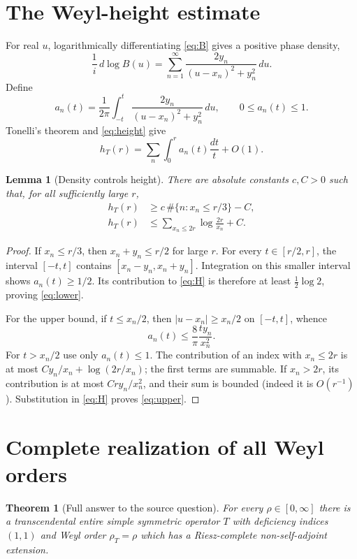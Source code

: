 \documentclass[11pt]{article}
\newtheorem{theorem}{Theorem}
\newtheorem{lemma}{Lemma}
\begin{document}
\section{The Weyl-height estimate}

For real $u$, logarithmically differentiating \eqref{eq:B} gives a positive
phase density,
\[
 \frac1i\,d\log B(u)
 =\sum_{n=1}^{\infty}\frac{2y_n}{(u-x_n)^2+y_n^2}\,du.
\]
Define
\[
 a_n(t)=\frac1{2\pi}\int_{-t}^{t}
          \frac{2y_n}{(u-x_n)^2+y_n^2}\,du,
 \qquad 0\le a_n(t)\le1.
\]
Tonelli's theorem and \eqref{eq:height} give
\begin{equation}\label{eq:H}
 h_T(r)=\sum_n\int_0^r a_n(t)\frac{dt}{t}+O(1).
\end{equation}

\begin{lemma}[Density controls height]\label{lem:height}
There are absolute constants $c,C>0$ such that, for all sufficiently large
$r$,
\begin{align}
 h_T(r)&\ge c\,\#\{n:x_n\le r/3\}-C,\label{eq:lower}\\
 h_T(r)&\le
 \sum_{x_n\le2r}\log\frac{2r}{x_n}+C.\label{eq:upper}
\end{align}
\end{lemma}

\begin{proof}
If $x_n\le r/3$, then $x_n+y_n\le r/2$ for large $r$.  For every
$t\in[r/2,r]$, the interval $[-t,t]$ contains
$[x_n-y_n,x_n+y_n]$.  Integration on this smaller interval shows
$a_n(t)\ge1/2$.  Its contribution to \eqref{eq:H} is therefore at least
$\frac12\log2$, proving \eqref{eq:lower}.

For the upper bound, if $t\le x_n/2$, then $|u-x_n|\ge x_n/2$ on
$[-t,t]$, whence
\[
 a_n(t)\le \frac{8}{\pi}\frac{t y_n}{x_n^2}.
\]
For $t>x_n/2$ use only $a_n(t)\le1$.  The contribution of an index with
$x_n\le2r$ is at most
$C y_n/x_n+\log(2r/x_n)$; the first terms are summable.  If $x_n>2r$, its
contribution is at most $Cr y_n/x_n^2$, and their sum is bounded (indeed it is
$O(r^{-1})$).  Substitution in \eqref{eq:H} proves \eqref{eq:upper}.
\end{proof}

\section{Complete realization of all Weyl orders}

\begin{theorem}[Full answer to the source question]\label{thm:main}
For every $\rho\in[0,\infty]$ there is a transcendental entire simple
symmetric operator $T$ with deficiency indices $(1,1)$ and Weyl order
$\rho_T=\rho$ which has a Riesz-complete non-self-adjoint extension.
\end{theorem}
\end{document}
